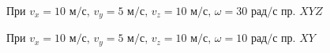 \documentclass[a5paper, 10pt]{article}
\theoremstyle{definition}
\theoremstyle{plain}
\theoremstyle{remark}
\begin{document}
\begin{figure}[!h]
	           \caption{При $v_x = 10 \text{ м/с}, \, v_y = 5  \text{ м/с}, \, v_z = 10  \text{ м/с}, \, \omega = 30 \text{ рад/с}$ пр. $XYZ$}
\end{figure}

\newpage
\begin{figure}[!h]
	           \caption{При $v_x = 10 \text{ м/с}, \, v_y = 5  \text{ м/с}, \, v_z = 10  \text{ м/с}, \, \omega = 10 \text{ рад/с}$ пр. $XY$}
\end{figure}
\end{document}
